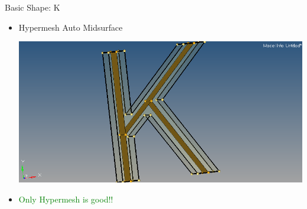 \begin{frame}{Basic Shape: K}
\begin{itemize}[noitemsep,label=\textbullet,topsep=2pt,parsep=2pt,partopsep=2pt]
\item Hypermesh Auto Midsurface

\includegraphics[scale=0.18]{../Common/images/HypermeshKauto.png}

\item \textcolor{green}{Only Hypermesh is good!!}
\end{itemize}
\end{frame}


